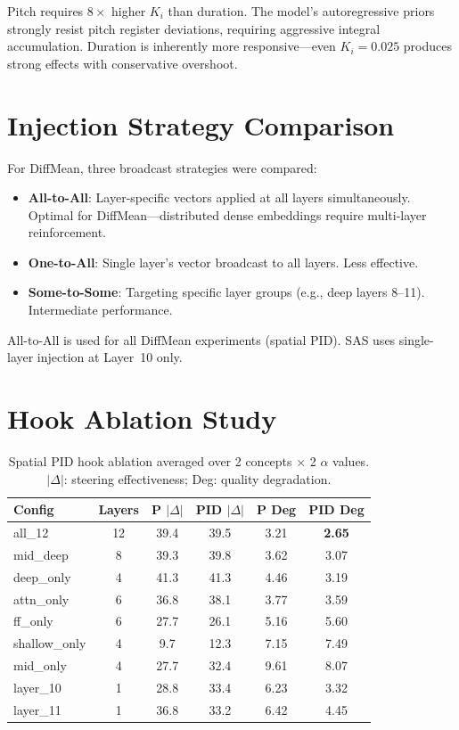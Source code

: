 \documentclass{article}
\theoremstyle{plain}
\begin{document}
Pitch requires $8{\times}$ higher $K_i$ than duration. The model's autoregressive priors strongly resist pitch register deviations, requiring aggressive integral accumulation. Duration is inherently more responsive---even $K_i{=}0.025$ produces strong effects with conservative overshoot.

\section{Injection Strategy Comparison}
\label{app:injection}

For DiffMean, three broadcast strategies were compared:
\begin{itemize}
    \item \textbf{All-to-All}: Layer-specific vectors applied at all layers simultaneously. Optimal for DiffMean---distributed dense embeddings require multi-layer reinforcement.
    \item \textbf{One-to-All}: Single layer's vector broadcast to all layers. Less effective.
    \item \textbf{Some-to-Some}: Targeting specific layer groups (e.g., deep layers 8--11). Intermediate performance.
\end{itemize}
All-to-All is used for all DiffMean experiments (spatial PID). SAS uses single-layer injection at Layer~10 only.

\section{Hook Ablation Study}
\label{app:hook_ablation}

\begin{table}[h]
  \caption{Spatial PID hook ablation averaged over 2 concepts $\times$ 2 $\alpha$ values. $|\Delta|$: steering effectiveness; Deg: quality degradation.}
  \label{tab:hook_ablation}
  \begin{center}
  \begin{small}
  \begin{tabular}{lccccc}
    \toprule
    Config & Layers & P $|\Delta|$ & PID $|\Delta|$ & P Deg & PID Deg \\
    \midrule
    all\_12 & 12 & 39.4 & 39.5 & 3.21 & \textbf{2.65} \\
    mid\_deep & 8 & 39.3 & 39.8 & 3.62 & 3.07 \\
    deep\_only & 4 & 41.3 & 41.3 & 4.46 & 3.19 \\
    attn\_only & 6 & 36.8 & 38.1 & 3.77 & 3.59 \\
    ff\_only & 6 & 27.7 & 26.1 & 5.16 & 5.60 \\
    shallow\_only & 4 & 9.7 & 12.3 & 7.15 & 7.49 \\
    mid\_only & 4 & 27.7 & 32.4 & 9.61 & 8.07 \\
    layer\_10 & 1 & 28.8 & 33.4 & 6.23 & 3.32 \\
    layer\_11 & 1 & 36.8 & 33.2 & 6.42 & 4.45 \\
    \bottomrule
  \end{tabular}
  \end{small}
  \end{center}
\end{table}
\end{document}
